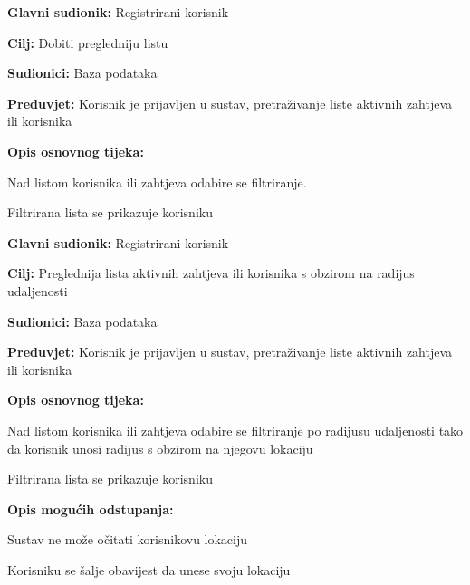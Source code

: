 \noindent {}
\begin{packed_item}
	\item \textbf{Glavni sudionik: } Registrirani korisnik
	\item  \textbf{Cilj:} Dobiti pregledniju listu 
	\item  \textbf{Sudionici:} Baza podataka
	\item  \textbf{Preduvjet:} Korisnik je prijavljen u sustav, pretraživanje liste aktivnih zahtjeva ili korisnika
	\item  \textbf{Opis osnovnog tijeka:}
	\item[] \begin{packed_enum}
		\item Nad listom korisnika ili zahtjeva odabire se filtriranje.
		\item Filtrirana lista se prikazuje korisniku
	\end{packed_enum}
\end{packed_item}

\noindent {}
\begin{packed_item}
	\item \textbf{Glavni sudionik: } Registrirani korisnik
	\item  \textbf{Cilj:} Preglednija lista aktivnih zahtjeva ili korisnika s obzirom na radijus udaljenosti 
	\item  \textbf{Sudionici:} Baza podataka
	\item  \textbf{Preduvjet:} Korisnik je prijavljen u sustav, pretraživanje liste aktivnih zahtjeva ili korisnika
	\item  \textbf{Opis osnovnog tijeka:}
	\item[] \begin{packed_enum}
		\item Nad listom korisnika ili zahtjeva odabire se filtriranje po radijusu udaljenosti tako da korisnik unosi radijus s obzirom na njegovu lokaciju
		\item Filtrirana lista se prikazuje korisniku
	\end{packed_enum}
	\item  \textbf{Opis mogućih odstupanja:}
	\item[] \begin{packed_item}
		\item[1.a] 	Sustav ne može očitati korisnikovu lokaciju
		\item[] \begin{packed_enum}
			\item Korisniku se šalje obavijest da unese svoju lokaciju
		\end{packed_enum}
	\end{packed_item}
\end{packed_item}

